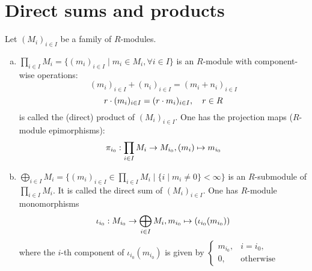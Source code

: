 \documentclass[a4paper]{report}
\begin{document}
\section{Direct sums and products}
Let $(M_{i})_{i \in I}$ be a family of $R$-modules.
\begin{defi}
\begin{enumerate}[(a)]
  \item $\prod_{i \in I}M_{i} = \{(m_{i})_{i \in I} \mid m_{i} \in M_{i}, \forall i \in I\}$ is an $R$-module with component-wise operations:
        \[(m_{i})_{i \in I} + (n_{i})_{i \in I} =(m_{i}+n_{i})_{i \in I}\]
        \[r \cdot (m_{i})_{i \in I} = (r \cdot m_{i})_{i \in I}, \quad r \in R\]
        is called the (direct) product of $(M_{i})_{i \in I}$. One has the projection maps ($R$-module epimorphisms):\[\pi_{i_{0}}: \prod_{i \in I} M_{i} \to M_{i_{0}}, (m_{i}) \mapsto m_{i_{0}}\]
        \item $\bigoplus_{i \in I}M_{i} = \{(m_{i})_{i \in I} \in \prod_{i \in I} M_{i} \mid \{i \mid m_{i} \ne 0\} < \infty \}$ is an $R$-submodule of $\prod_{i \in I} M_{i}$. It is called the direct sum of $(M_{i})_{i \in I}$. One has $R$-module monomorphisms \[\iota_{i_{0}} : M_{i_{0}} \to \bigoplus_{i \in I} M_{i}, m_{i_{0}} \mapsto (\iota_{i_{0}}(m_{i_{0}}))\]
where the $i$-th component of $\iota_{i_{0}}(m_{i_{0}})$ is given by $\begin{cases} m_{i_{0}}, & i = i_{0}, \\ 0, & \text{otherwise}
\end{cases}$
\end{enumerate}
\end{defi}
\end{document}
